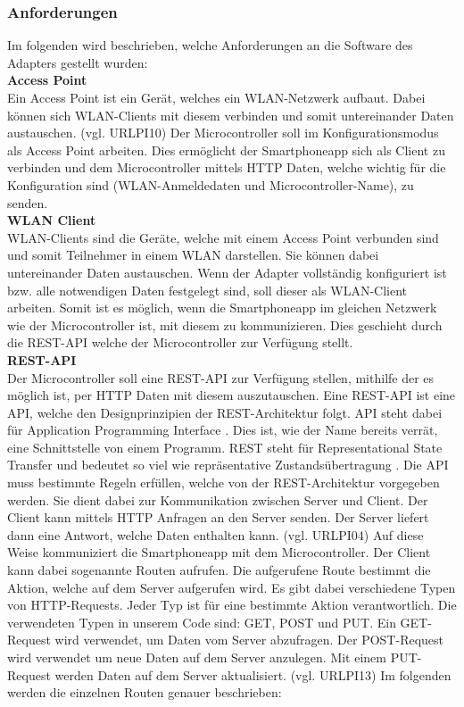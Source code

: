 \documentclass[11pt, twoside]{article}
\begin{document}
\subsubsection{Anforderungen}
Im folgenden wird beschrieben, welche Anforderungen an die Software des Adapters gestellt wurden: \newline \\
\textbf{Access Point} \\
Ein Access Point ist ein Gerät, welches ein WLAN-Netzwerk aufbaut. Dabei können sich WLAN-Clients mit diesem verbinden und somit untereinander Daten austauschen. (vgl. URLPI10)
Der Microcontroller soll im Konfigurationsmodus als Access Point arbeiten. Dies ermöglicht der Smartphoneapp sich als Client zu verbinden und dem Microcontroller mittels HTTP Daten, welche wichtig für die Konfiguration sind (WLAN-Anmeldedaten und Microcontroller-Name), zu senden. \newline \\
\textbf{WLAN Client} \\
WLAN-Clients sind die Geräte, welche mit einem Access Point verbunden sind und somit Teilnehmer in einem WLAN darstellen. Sie können dabei untereinander Daten austauschen.
Wenn der Adapter vollständig konfiguriert ist bzw. alle notwendigen Daten festgelegt sind, soll dieser als WLAN-Client arbeiten. Somit ist es möglich, wenn die Smartphoneapp im gleichen Netzwerk wie der Microcontroller ist, mit diesem zu kommunizieren. Dies geschieht durch die REST-API welche der Microcontroller zur Verfügung stellt. \newline \\
\textbf{REST-API} \\
Der Microcontroller soll eine REST-API zur Verfügung stellen, mithilfe der es möglich ist, per HTTP Daten mit diesem auszutauschen. Eine REST-API ist eine API, welche den Designprinzipien der REST-Architektur folgt. API steht dabei für \glqq Application Programming Interface \grqq{}. Dies ist, wie der Name bereits verrät, eine Schnittstelle von einem Programm. REST steht für \glqq Representational State Transfer \grqq{} und bedeutet so viel wie \glqq repräsentative Zustandsübertragung \grqq{}. Die API muss bestimmte Regeln erfüllen, welche von der REST-Architektur vorgegeben werden. Sie dient dabei zur Kommunikation zwischen Server und Client. Der Client kann mittels HTTP Anfragen an den Server senden. Der Server liefert dann eine Antwort, welche Daten enthalten kann. (vgl. URLPI04) Auf diese Weise kommuniziert die Smartphoneapp mit dem Microcontroller. Der Client kann dabei sogenannte Routen aufrufen. Die aufgerufene Route bestimmt die Aktion, welche auf dem Server aufgerufen wird. Es gibt dabei verschiedene Typen von HTTP-Requests. Jeder Typ ist für eine bestimmte Aktion verantwortlich. Die verwendeten Typen in unserem Code sind: GET, POST und PUT. Ein GET-Request wird verwendet, um Daten vom Server abzufragen. Der POST-Request wird verwendet um neue Daten auf dem Server anzulegen. Mit einem PUT-Request werden Daten auf dem Server aktualisiert. (vgl. URLPI13) Im folgenden werden die einzelnen Routen genauer beschrieben: \newline \\
\end{document}
